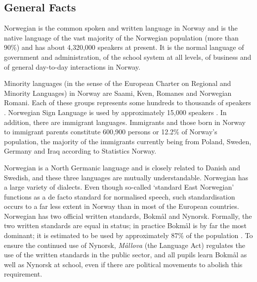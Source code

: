 \clearpage


\begin{multicols}{2}

\subsection{General Facts}

Norwegian is the common spoken and written language in Norway and is the native language of the vast majority of the Norwegian population (more than 90\%) and has about 4,320,000 speakers at present.
It is the normal language of government and administration, of the school system at all levels, of business and of general day-to-day interactions in Norway.


Minority languages (in the sense of the European Charter on Regional and Minority Languages) in Norway are Saami, Kven, Romanes and Norwegian Romani.
Each of these groups represents some hundreds to thousands of speakers \cite{stm35:2008}. 
Norwegian Sign Language is used by approximately 15,000 speakers \cite{Erl:2007}. 
In addition, there are immigrant languages.
Immigrants and those born in Norway to immigrant parents constitute 600,900 persons or 12.2\% of Norway’s population, the majority of the immigrants currently being from Poland, Sweden, Germany and Iraq according to Statistics Norway.

Norwegian is a North Germanic language and is closely related to Danish and Swedish, and these three languages are mutually understandable. 
Norwegian has a large variety of dialects. 
Even though so-called ‘standard East Norwegian’ functions as a de facto standard for normalised speech, such standardisation occurs to a far less extent in Norway than in most of the European countries.
Norwegian has two official written standards, Bokmål and Nynorsk. 
Formally, the two written standards are equal in status; in practice Bokmål is by far the most dominant; it is estimated to be used by approximately 87\% of the population \cite{stm35:2008}.
To ensure the continued use of Nynorsk, \textit{Mållova} (the Language Act) regulates the use of the written standards in the public sector, and all pupils learn Bokmål as well as Nynorsk at school, even if there are political movements to abolish this requirement.


\end{multicols}
